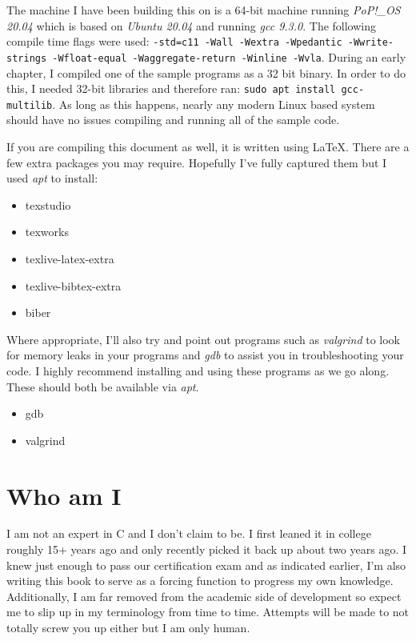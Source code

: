 \documentclass[../main.tex]{subfiles}
\begin{document}
The machine I have been building this on is a 64-bit machine running \emph{PoP!\_OS 20.04} which is based on \emph{Ubuntu 20.04} and running \emph{gcc 9.3.0}. The following compile time flags were used: \texttt{-std=c11 -Wall -Wextra -Wpedantic -Wwrite-strings -Wfloat-equal -Waggregate-return -Winline -Wvla}. During an early chapter, I compiled one of the sample programs as a 32 bit binary.  In order to do this, I needed 32-bit libraries and therefore ran: \texttt{sudo apt install gcc-multilib}.  As long as this happens, nearly any modern Linux based system should have no issues compiling and running all of the sample code.  

If you are compiling this document as well, it is written using \LaTeX.  There are a few extra packages you may require.  Hopefully I've fully captured them but I used \textit{apt} to install:
\begin{itemize}
	\item texstudio
	\item texworks
	\item texlive-latex-extra
	\item texlive-bibtex-extra
	\item biber
\end{itemize}

Where appropriate, I'll also try and point out programs such as \textit{valgrind} to look for memory leaks in your programs and \textit{gdb} to assist you in troubleshooting your code. I highly recommend installing and using these programs as we go along.  These should both be available via \textit{apt}.
\begin{itemize}
	\item gdb
	\item valgrind
\end{itemize}

\section{Who am I}
I am not an expert in C and I don't claim to be.  I first leaned it in college roughly 15+ years ago and only recently picked it back up about two years ago.  I knew just enough to pass our certification exam and as indicated earlier, I'm also writing this book to serve as a forcing function to progress my own knowledge.  Additionally, I am far removed from the academic side of development so expect me to slip up in my terminology from time to time.  Attempts will be made to not totally screw you up either but I am only human.
\end{document}
